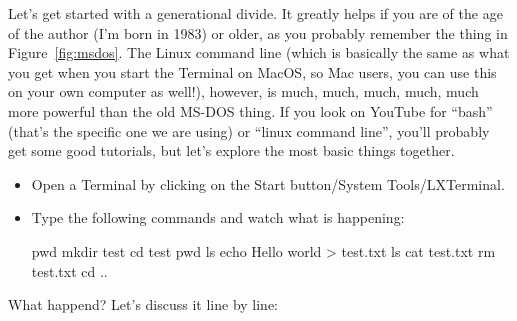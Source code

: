 \documentclass[a4paper,12pt]{book}
\renewcommand{\texttt}[1]{%
  \begingroup
  \ttfamily
  \begingroup\lccode`~=`/\lowercase{\endgroup\def~}{/\discretionary{}{}{}}%
  \begingroup\lccode`~=`[\lowercase{\endgroup\def~}{[\discretionary{}{}{}}%
  \begingroup\lccode`~=`.\lowercase{\endgroup\def~}{.\discretionary{}{}{}}%
  \begingroup\lccode`~=`(\lowercase{\endgroup\def~}{(\discretionary{}{}{}}%
  \catcode`/=\active\catcode`[=\active\catcode`.=\active\catcode`(=\active
  \scantokens{#1\noexpand}%
  \endgroup
}
\begin{document}
 Let’s get started with a generational divide. It greatly helps if you are of the age of the author (I'm born in 1983) or older, as you probably remember the thing in Figure~\ref{fig:msdos}. The Linux command line (which is basically the same as what you get when you start the Terminal on MacOS, so Mac users, you can use this on your own computer as well!), however, is much, much, much, much, much more powerful than the old MS-DOS thing. If you look on YouTube for ``bash'' (that's the specific one we are using) or ``linux command line'', you'll probably get some good tutorials, but let's explore the most basic things together.
 \begin{itemize}
 \item Open a Terminal by clicking on the Start button/System Tools/LXTerminal.
 \item Type the following commands and watch what is happening: \begin{lstlistingbash}
pwd
mkdir test
cd test
pwd
ls
echo Hello world > test.txt
ls
cat test.txt
rm test.txt
cd ..
 \end{lstlistingbash}
\end{itemize}
What happend? Let's discuss it line by line:
 
\end{document}
